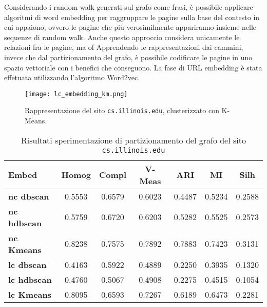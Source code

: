 Considerando i random walk generati sul grafo come frasi, è possibile applicare algoritmi di word embedding per raggruppare le pagine sulla base del contesto in cui appaiono, ovvero le pagine che più verosimilmente appariranno insieme nelle sequenze di random walk. Anche questo approccio considera unicamente le relazioni fra le pagine, ma of Apprendendo le rappresentazioni dai cammini, invece che dal partizionamento del grafo, è possibile codificare le pagine in uno spazio vettoriale con i benefici che conseguono. La fase di URL embedding è stata effetuata utilizzando l'algoritmo Word2vec.
\begin{figure}[h!]
	\centering
	\texttt{[image: lc\_embedding\_km.png]}
	\caption{Rappresentazione del sito \texttt{cs.illinois.edu}, clusterizzato con K-Means.}
	\label{nc_embedding_km}
\end{figure}
\begin{table}[H]
	\begin{tabular}{| l | c | c | c | c | c | c |}
	\hline
	\textbf{Embed}  & \textbf{Homog} & \textbf{Compl} & \textbf{V-Meas}  & \textbf{ARI}  & \textbf{MI}  & \textbf{Silh} \\ [3ex] \hline
	\textbf{nc dbscan} & 0.5553 & 0.6579 & 0.6023 & 0.4487 & 0.5234 & 0.2588\\ [3ex]
	 \hline 
	\textbf{nc hdbscan} & 0.5759 & 0.6720 & 0.6203 & 0.5282 & 0.5525 & 0.2573\\ [3ex]
	 \hline
	\textbf{nc Kmeans} & 0.8238 & 0.7575 & 0.7892 & 0.7883 & 0.7423 & 0.3131\\ [3ex]
	 \hline	
	\textbf{lc dbscan} & 0.4163 & 0.5922 & 0.4889 & 0.2250 & 0.3935 & 0.1320\\ [3ex]
	\hline
	\textbf{lc hdbscan} & 0.4760 & 0.5067 & 0.4908 & 0.2275 & 0.4515 & 0.1054\\ [3ex]
	\hline
	
	\textbf{lc Kmeans} & 0.8095 & 0.6593 & 0.7267 & 0.6189 & 0.6473 & 0.2281\\ [3ex]
	\hline
	\end{tabular}
	\caption{Risultati sperimentazione di partizionamento del grafo del sito \texttt{cs.illinois.edu}}
	\label{metricheEmbed}
\end{table}

